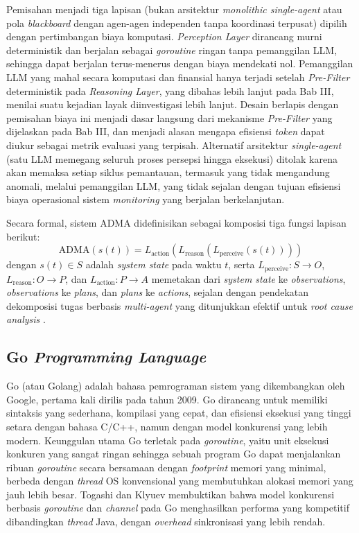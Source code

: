 Pemisahan menjadi tiga lapisan (bukan arsitektur \textit{monolithic single-agent} atau pola \textit{blackboard} dengan agen-agen independen tanpa koordinasi terpusat) dipilih dengan pertimbangan biaya komputasi. \textit{Perception Layer} dirancang murni deterministik dan berjalan sebagai \textit{goroutine} ringan tanpa pemanggilan LLM, sehingga dapat berjalan terus-menerus dengan biaya mendekati nol. Pemanggilan LLM yang mahal secara komputasi dan finansial hanya terjadi setelah \textit{Pre-Filter} deterministik pada \textit{Reasoning Layer}, yang dibahas lebih lanjut pada Bab III, menilai suatu kejadian layak diinvestigasi lebih lanjut. Desain berlapis dengan pemisahan biaya ini menjadi dasar langsung dari mekanisme \textit{Pre-Filter} yang dijelaskan pada Bab III, dan menjadi alasan mengapa efisiensi \textit{token} dapat diukur sebagai metrik evaluasi yang terpisah. Alternatif arsitektur \textit{single-agent} (satu LLM memegang seluruh proses persepsi hingga eksekusi) ditolak karena akan memaksa setiap siklus pemantauan, termasuk yang tidak mengandung anomali, melalui pemanggilan LLM, yang tidak sejalan dengan tujuan efisiensi biaya operasional sistem \textit{monitoring} yang berjalan berkelanjutan.

Secara formal, sistem ADMA didefinisikan sebagai komposisi tiga fungsi lapisan berikut:
\begin{equation}
  \text{ADMA}(s(t)) = L_{\text{action}}(L_{\text{reason}}(L_{\text{perceive}}(s(t))))
\end{equation}
dengan $s(t) \in S$ adalah \textit{system state} pada waktu $t$, serta $L_{\text{perceive}}: S \to O$, $L_{\text{reason}}: O \to P$, dan $L_{\text{action}}: P \to A$ memetakan dari \textit{system state} ke \textit{observations}, \textit{observations} ke \textit{plans}, dan \textit{plans} ke \textit{actions}, sejalan dengan pendekatan dekomposisi tugas berbasis \textit{multi-agent} yang ditunjukkan efektif untuk \textit{root cause analysis} \cite{fu2025leveraging}.

\subsection{Go \textit{Programming Language}}

Go (atau Golang) adalah bahasa pemrograman sistem yang dikembangkan oleh Google, pertama kali dirilis pada tahun 2009. Go dirancang untuk memiliki sintaksis yang sederhana, kompilasi yang cepat, dan efisiensi eksekusi yang tinggi setara dengan bahasa C/C++, namun dengan model konkurensi yang lebih modern. Keunggulan utama Go terletak pada \textit{goroutine}, yaitu unit eksekusi konkuren yang sangat ringan sehingga sebuah program Go dapat menjalankan ribuan \textit{goroutine} secara bersamaan dengan \textit{footprint} memori yang minimal, berbeda dengan \textit{thread} OS konvensional yang membutuhkan alokasi memori yang jauh lebih besar. Togashi dan Klyuev \cite{togashi2014concurrency} membuktikan bahwa model konkurensi berbasis \textit{goroutine} dan \textit{channel} pada Go menghasilkan performa yang kompetitif dibandingkan \textit{thread} Java, dengan \textit{overhead} sinkronisasi yang lebih rendah.

